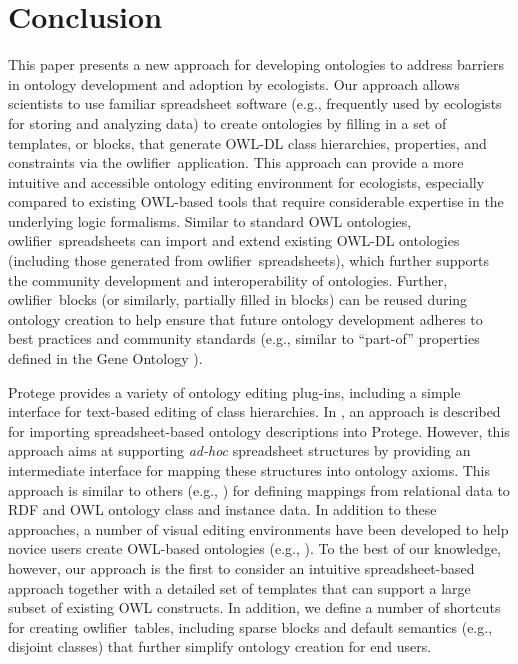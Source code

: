 \documentclass[5p,authoryear]{elsarticle}
\newcommand{\owlifier}{\textsf{owlifier}}
\begin{document}
\section{Conclusion}
\label{sec:conclusion}

This paper presents a new approach for developing ontologies to address barriers in ontology development and adoption by ecologists. Our approach allows scientists to use familiar spreadsheet software (e.g., frequently used by ecologists for storing and analyzing data) to create ontologies by filling in a set of templates, or blocks, that generate OWL-DL class hierarchies, properties, and constraints via the \owlifier\ application.  This approach can provide a more intuitive and accessible ontology editing environment for ecologists, especially compared to existing OWL-based tools that require considerable expertise in the underlying logic formalisms. Similar to standard OWL ontologies, \owlifier\ spreadsheets can import and extend existing OWL-DL ontologies (including those generated from \owlifier\ spreadsheets), which further supports the community development and interoperability of ontologies. Further, \owlifier\ blocks (or similarly, partially filled in blocks) can be reused during ontology creation to help ensure that future ontology development adheres to best practices and community standards (e.g., similar to ``part-of'' properties defined in the Gene Ontology \citep{bada04:_short_study_succes_of_gene_ontol}).

Protege provides a variety of ontology editing plug-ins, including a simple interface for text-based editing of class hierarchies. In \citep{kola07:_impor_spread_data_into_proteg}, an approach is described for importing spreadsheet-based ontology descriptions into Protege. However, this approach aims at supporting \emph{ad-hoc} spreadsheet structures by providing an intermediate interface for mapping these structures into ontology axioms. This approach is similar to others (e.g., \citep{han08:_rdf12,bizer03:_d2r_map,an06:_discov_seman_of_relat_tables_throug_mappin}) for defining mappings from relational data to RDF and OWL ontology class and instance data. In addition to these approaches, a number of visual editing environments have been developed to help novice users create OWL-based ontologies (e.g., \citep{hayes05:_collab_knowl_captur_in_ontol}). To the best of our knowledge, however, our approach is the first to consider an intuitive spreadsheet-based approach together with a detailed set of templates that can support a large subset of existing OWL constructs. In addition, we define a number of shortcuts for creating \owlifier\ tables, including sparse blocks and default semantics (e.g., disjoint classes) that further simplify ontology creation for end users.
\end{document}
